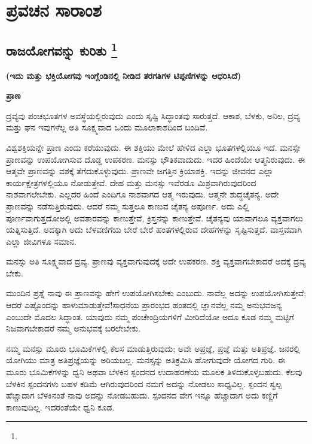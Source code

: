 

\part{ಪ್ರವಚನ ಸಾರಾಂಶ}

\chapter[ರಾಜಯೋಗವನ್ನು ಕುರಿತು ]{ರಾಜಯೋಗವನ್ನು ಕುರಿತು \protect\footnote{}}

\centerline{\textbf{(ಇದು ಮತ್ತು ಭಕ್ತಿಯೋಗವು ಇಂಗ್ಲೆಂಡಿನಲ್ಲಿ ನೀಡಿದ ತರಗತಿಗಳ ಟಿಪ್ಪಣಿಗಳನ್ನು ಆಧರಿಸಿದೆ)}}

\vskip -0.8cm

\begin{center}
\textbf{ಪ್ರಾಣ}
\end{center}

\vskip -0.5cm

ದ್ರವ್ಯವು ಪಂಚಭೂತಗಳ ಅವಸ್ಥೆಯಲ್ಲಿರುವುದು ಎಂದು ಸೃಷ್ಟಿ ಸಿದ್ಧಾಂತವು ಸಾರುತ್ತದೆ. ಆಕಾಶ, ಬೆಳಕು, ಅನಿಲ, ದ್ರವ್ಯ ಮತ್ತು ಘನ ಇವುಗಳೆಲ್ಲ ಅತಿ ಸೂಕ್ಷ್ಮವಾದ ಒಂದು ಮೂಲಾಕಾಶದಿಂದ ಬಂದಿವೆ.

ವಿಶ್ವಶಕ್ತಿಯನ್ನೇ ಪ್ರಾಣ ಎಂದು ಕರೆಯುವುದು. ಈ ಶಕ್ತಿಯು ಮೇಲೆ ಹೇಳಿದ ಎಲ್ಲಾ ಭೂತಗಳಲ್ಲಿಯೂ ಇದೆ. ಮನಸ್ಸೇ ಪ್ರಾಣವನ್ನು ಉಪಯೋಗಿಸುವ ದೊಡ್ಡ ಉಪಕರಣ. ಮನಸ್ಸು ಭೌತಿಕವಾದುದು. ಇದರ ಹಿಂದೆಯೇ ಆತ್ಮನಿರುವುದು. ಈ ಆತ್ಮವೇ ಪ್ರಾಣವನ್ನು ವಶಕ್ಕೆ ತೆಗೆದುಕೊಳ್ಳುವುದು. ಪ್ರಾಣವೇ ಜಗತ್ತಿನ ಕ್ರಿಯಾಶಕ್ತಿ. ಇದನ್ನು ಜೀವನದ ಎಲ್ಲಾ ಕಾರ್ಯಕ್ಷೇತ್ರಗಳಲ್ಲಿಯೂ ನೋಡುತ್ತೇವೆ. ದೇಹ ಮತ್ತು ಮನಸ್ಸು ಇವೆರಡೂ ಮಿಶ್ರವಾಗಿರುವುದರಿಂದ ನಾಶವಾಗಲೇಬೇಕು. ಎಲ್ಲದರ ಹಿಂದೆ ಎಂದಿಗೂ ನಾಶವಾಗದ ಆತ್ಮ ಇರುವುದು. ಆತ್ಮನೇ ಶುದ್ಧಚೈತನ್ಯ. ಅದೇ ಪ್ರಾಣವನ್ನು ನಡೆಸುತ್ತಿರುವುದು. ಆದರೆ ನಮ್ಮ ಸುತ್ತಲೂ ಕಾಣುವ ಚೈತನ್ಯ ಅಪೂರ್ಣ. ಅದು ಎಲ್ಲಿ ಪೂರ್ಣವಾಗುತ್ತದೋ\break ಅಲ್ಲಿ ಅವತಾರವನ್ನು ಕಾಣುತ್ತೇವೆ, ಕ್ರಿಸ್ತನನ್ನು ಕಾಣುತ್ತೇವೆ. ಚೈತನ್ಯವು ಯಾವಾಗಲೂ ವ್ಯಕ್ತವಾಗಲು ಯತ್ನಿಸುತ್ತಿದೆ. ಅದಕ್ಕಾಗಿ ಅದು ಬೆಳವಣಿಗೆಯ ಬೇರೆ ಬೇರೆ ಹಂತಗಳಲ್ಲಿರುವ ದೇಹಗಳನ್ನು ಸೃಷ್ಟಿಸುತ್ತದೆ. ವಾಸ್ತವವಾಗಿ ಎಲ್ಲಾ ಜೀವಿಗಳೂ ಸಮಾನ.

ಮನಸ್ಸು ಅತಿ ಸೂಕ್ಷ್ಮವಾದ ದ್ರವ್ಯ. ಪ್ರಾಣವು ವ್ಯಕ್ತವಾಗುವುದಕ್ಕೆ ಅದೇ ಉಪಕರಣ. ಶಕ್ತಿ ವ್ಯಕ್ತವಾಗಬೇಕಾದರೆ ಅದಕ್ಕೆ ದ್ರವ್ಯ ಬೇಕು.

ಮುಂದಿನ ಪ್ರಶ್ನೆ ನಾವು ಈ ಪ್ರಾಣವನ್ನು ಹೇಗೆ ಉಪಯೋಗಿಸಬೇಕು ಎಂಬುದು. ನಾವೆಲ್ಲ ಅದನ್ನು ಉಪಯೋಗಿಸುತ್ತೇವೆ; ಆದರೆ ಎಷ್ಟೊಂದನ್ನು ಹಾಳುಮಾಡುತ್ತೇವೆ!\break ಸಾಧನೆಯ ಪ್ರಾರಂಭದ ಹಂತದಲ್ಲಿ ಜ್ಞಾನವೆಲ್ಲ ನಮ್ಮ ಅನುಭವಜನ್ಯ ಎಂಬುದೇ ಮೊದಲ ಸಿದ್ಧಾಂತ. ಯಾವುದು ನಮ್ಮ ಪಂಚೇಂದ್ರಿಯಗಳಿಗೆ ಮೀರಿದೆಯೋ ಅದೂ ಕೂಡ ನಮ್ಮ ಮಟ್ಟಿಗೆ ನಿಜವಾಗಬೇಕಾದರೆ ನಮ್ಮ ಅನುಭವಕ್ಕೆ ಬರಲೇಬೇಕು.

ನಮ್ಮ ಮನಸ್ಸು ಮೂರು ಭೂಮಿಕೆಗಳಲ್ಲಿ ಕೆಲಸ ಮಾಡುತ್ತಿರುವುದು; ಅವೇ ಅಪ್ರಜ್ಞೆ, ಪ್ರಜ್ಞೆ ಮತ್ತು ಅತಿಪ್ರಜ್ಞೆ. ಜನರಲ್ಲಿ ಯೋಗಿಯು ಮಾತ್ರ ಅತಿಪ್ರಜ್ಞೆಯನ್ನು ಅರಿಯಬಲ್ಲ. ಮನಸ್ಸನ್ನು ಅತಿಕ್ರಮಿಸಿ ಹೋಗುವುದೇ ಯೋಗದ ಗುರಿ. ಈ ಮೂರು ಭೂಮಿಕೆಗಳನ್ನು ಧ್ವನಿ ಅಥವಾ ಬೆಳಕಿನ ಸ್ಪಂದನದ ಉದಾಹರಣೆಯ ಮೂಲಕ ತಿಳಿದುಕೊಳ್ಳಬಹುದು. ಕೆಲವು ಬೆಳಕಿನ ಸ್ಪಂದನಗಳು ಬಹಳ ಕಡಿಮೆ ಆಗಿರುವುದರಿಂದ ನಮಗೆ ಅದನ್ನು ನೋಡಲು ಸಾಧ್ಯವಿಲ್ಲ. ಸ್ಪಂದನ ಸ್ವಲ್ಪ ಹೆಚ್ಚಾದಾಗ ಬೆಳಕಿನಂತೆ ನಾವು ಅದನ್ನು ನೋಡಬಹುದು. ಸ್ಪಂದನದ ವೇಗ ಇನ್ನೂ ಹೆಚ್ಚಾದಾಗ ಅದು ಕಣ್ಣಿಗೆ ಕಾಣುವುದಿಲ್ಲ. ಇದರಂತೆಯೇ ಧ್ವನಿ ಕೂಡ.

